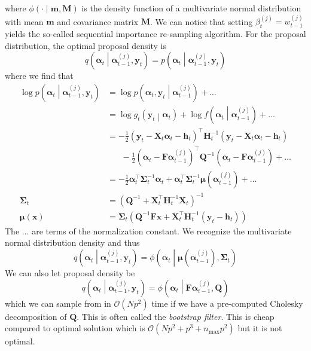 \documentclass[notitlepage]{article}
\renewcommand{\vec}[1]{\bm{#1}}
\newcommand{\mat}[1]{\mathbf{#1}}
\newcommand{\Lparen}[1]{\left( #1\right)}
\newcommand{\Cond}[2]{ #1 \middle\vert  #2}
\newcommand{\optor}[2]{#1\Lparen{#2}}
\newcommand{\optorC}[3]{\optor{#1}{\Cond{#2}{#3}}}
\newcommand{\pdensC}[2]{\optorC{p}{#1}{#2}}
\newcommand{\normaldC}[3]{\optorC{\phi}{#1}{#2,#3}}
\newcommand{\IDC}[2]{\optorC{q}{#1}{#2}}
\newcommand{\partic}[3]{#1_{#2}^{\Lparen{#3}}}
\newcommand{\bigO}[1]{\mathcal{O}\Lparen{#1}}
\newcommand{\dimState}{p}
\newcommand{\nPart}{N}
\newcommand{\nMax}{n_{\text{max}}}
\begin{document}
% 
where $\normaldC{\cdot}{\vec m}{\mat M}$ is the density function of a multivariate normal 
distribution with mean $\vec m$ and covariance matrix $\mat M$. 
We can notice that setting $\partic\beta tj = \partic w{t-1}j$ yields the 
so-called sequential importance 
re-sampling algorithm. For the proposal distribution, the optimal proposal density is%
%
$$
\IDC{\vec\alpha_t}{\partic{\vec\alpha}{t-1}j, \vec y_t} 
	= \pdensC{\vec\alpha_t}{\partic{\vec\alpha}{t-1}j, \vec y_t}
$$%
% 
where we find that %
%
\begin{align}
\log \pdensC{\vec\alpha_t}{\partic{\vec\alpha}{t-1}j, \vec y_t} 
	&=\log \pdensC{\vec\alpha_t, \vec y_t}{\partic{\vec\alpha}{t-1}j} + \dots 
	\nonumber\\
	&=\log \optorC{g_t}{\vec y_t}{\vec{\alpha}_t} + 
		\log\optorC{f}{\vec\alpha_t}{\partic{\vec\alpha}{t-1}j} + \dots 
		\nonumber\\
	&= -\frac 12\Lparen{\vec y_t - \mat X_t\vec \alpha_t - \vec h_t}^\top 
		\mat H^{-1}_t\Lparen{\vec y_t - \mat X_t\vec\alpha_t - \vec h_t} 
		\nonumber\\
		&\hspace{20pt}-\frac 12\Lparen{\vec\alpha_t - \mat F\partic{\vec\alpha}{t-1}j}^\top\mat Q^{-1}
		\Lparen{\vec\alpha_t - \mat F\partic{\vec\alpha}{t-1}j} + \dots 
		\nonumber\\
	&= - \frac 12\vec\alpha_t^\top\mat\Sigma^{-1}_t\vec\alpha_t
		+\vec\alpha_t^\top\mat \Sigma^{-1}_t\vec\mu\Lparen{\partic{\vec\alpha}{t-1}j} + \dots \nonumber\\
\mat\Sigma_t &= \Lparen{\mat Q^{-1} + \mat X_t^\top\mat H_t^{-1}\mat X_t}^{-1} 
	\label{eq:fwNormProCovar}\\
\vec\mu(\vec x) &= \mat\Sigma_t\Lparen{
	\mat Q^{-1}\mat F\vec x + \mat X^\top_t\mat H_t^{-1} (\vec y_t - \vec h_t)}
	\label{eq:fwNormProMean}
\end{align}%
% 
The $\dots$ are terms of the normalization constant. We recognize the multivariate normal distribution density and thus %
%
$$\IDC{\vec\alpha_t}{\partic{\vec\alpha}{t-1}j, \vec y_t}  
	= \normaldC{\vec\alpha_t}{\vec\mu(\partic{\vec\alpha}{t-1}j)}{\mat\Sigma_t}
$$%
%
We can also let proposal density be%
%
\begin{equation}
	\IDC{\vec{\alpha}_t}{\partic{\vec{\alpha}}{t-1}{j}, \vec{y}_t} = %
		\normaldC{\vec\alpha_t}{\mat{F}\partic{\vec{\alpha}}{t-1}{j}}{\mat{Q}}
\end{equation}%
%
which we can sample from in $\bigO{\nPart \dimState^2}$ time if we have a pre-computed Cholesky 
decomposition of $\mat{Q}$. This is often called the \emph{bootstrap filter}. This is cheap 
compared to optimal solution which is $\bigO{\nPart \dimState^2  + \dimState^3 + \nMax \dimState^2}$ but it is not optimal.
\end{document}
